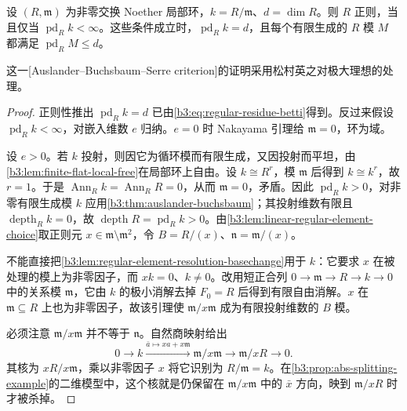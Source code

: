 \begin{theorem}\label{b3:thm:regular-local-homological-criterion}
	设 \((R,\mathfrak m)\) 为非零交换 Noether 局部环，\(k=R/\mathfrak m\)、\(d=\dim R\)。则 \(R\) 正则，当且仅当 \(\operatorname{pd}_Rk<\infty\)。这些条件成立时，\(\operatorname{pd}_Rk=d\)，且每个有限生成的 \(R\) 模 \(M\) 都满足 \(\operatorname{pd}_RM\le d\)。
\end{theorem}

这一[Auslander--Buchsbaum--Serre criterion]的证明采用松村英之\cite[Theorem 19.2, pp. 156--157]{Matsumura1989CommutativeRingTheory}对极大理想的处理。

\begin{proof}
	正则性推出 \(\operatorname{pd}_Rk=d\) 已由\eqref{b3:eq:regular-residue-betti}得到。反过来假设 \(\operatorname{pd}_Rk<\infty\)，对嵌入维数 \(e\) 归纳。\(e=0\) 时 Nakayama 引理给 \(\mathfrak m=0\)，环为域。

	设 \(e>0\)。若 \(k\) 投射，则因它为循环模而有限生成，又因投射而平坦，由\cref{b3:lem:finite-flat-local-free}在局部环上自由。设 \(k\cong R^r\)，模 \(\mathfrak m\) 后得到 \(k\cong k^r\)，故 \(r=1\)。于是 \(\operatorname{Ann}_Rk=\operatorname{Ann}_RR=0\)，从而 \(\mathfrak m=0\)，矛盾。因此 \(\operatorname{pd}_Rk>0\)，对非零有限生成模 \(k\) 应用\cref{b3:thm:auslander-buchsbaum}；其投射维数有限且 \(\operatorname{depth}_Rk=0\)，故 \(\operatorname{depth}R=\operatorname{pd}_Rk>0\)。由\cref{b3:lem:linear-regular-element-choice}取正则元 \(x\in\mathfrak m\setminus\mathfrak m^2\)，令 \(B=R/(x)\)、\(\mathfrak n=\mathfrak m/(x)\)。

	不能直接把\cref{b3:lem:regular-element-resolution-basechange}用于 \(k\)：它要求 \(x\) 在被处理的模上为非零因子，而 \(xk=0\)、\(k\ne0\)。改用短正合列 \(0\to\mathfrak m\to R\to k\to0\) 中的关系模 \(\mathfrak m\)，它由 \(k\) 的极小消解去掉 \(F_0=R\) 后得到有限自由消解。\(x\) 在 \(\mathfrak m\subseteq R\) 上也为非零因子，故该引理使 \(\mathfrak m/x\mathfrak m\) 成为有限投射维数的 \(B\) 模。

	必须注意 \(\mathfrak m/x\mathfrak m\) 并不等于 \(\mathfrak n\)。自然商映射给出
	\[
		0\longrightarrow k\xrightarrow{\bar a\mapsto xa+x\mathfrak m} \mathfrak m/x\mathfrak m\longrightarrow\mathfrak m/xR \longrightarrow0.
	\]
	其核为 \(xR/x\mathfrak m\)，乘以非零因子 \(x\) 将它识别为 \(R/\mathfrak m=k\)。在\cref{b3:prop:abs-splitting-example}的二维模型中，这个核就是仍保留在 \(\mathfrak m/x\mathfrak m\) 中的 \(\bar x\) 方向，映到 \(\mathfrak m/xR\) 时才被杀掉。


\end{proof}
